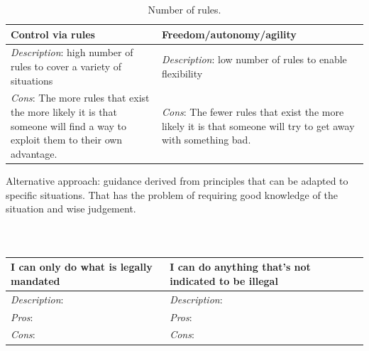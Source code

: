 \begin{center}
\begin{table}[ht]
\begin{tabular}{ | m{\dilemmatablewidth}| m{\dilemmatablewidth} | } 
  \hline
  \textbf{Control via rules} & \textbf{Freedom/autonomy/agility} \\ 
  \hline
  \textit{Description}: high number of rules to cover a variety of situations & 
  \textit{Description}: low number of rules to enable flexibility \\ 
  \hline
  \textit{Cons}: The more rules that exist the more likely it is that someone will find a way to exploit them to their own advantage. & 
  \textit{Cons}: The fewer rules that exist the more likely it is that someone will try to get away with something bad. \\  
  \hline
\end{tabular}
\caption{Number of rules.
}
\label{table:number_of_rules}
\end{table}
\end{center}
Alternative approach: guidance derived from principles that can be adapted to specific situations. That has the problem of requiring good knowledge of the situation and wise judgement.

\ \\

\begin{center}
\begin{table}[ht]
\begin{tabular}{ | m{\dilemmatablewidth}| m{\dilemmatablewidth} | } 
  \hline
  \textbf{I can only do what is legally mandated} & 
  \textbf{I can do anything that's not indicated to be illegal} \\ 
  \hline
  \textit{Description}:  &
  \textit{Description}:  \\
  \hline
  \textit{Pros}:  &
  \textit{Pros}:  \\
  \hline
  \textit{Cons}:  &
  \textit{Cons}:  \\  
  \hline
\end{tabular}
\caption{
}
\label{table:legality}
\end{table}
\end{center}


